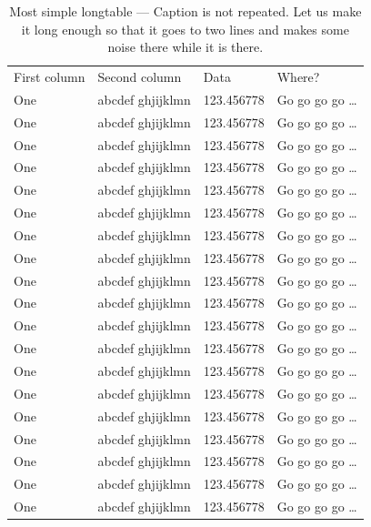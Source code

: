 \documentclass[phd,showframe]{ndsu-thesis-2022}
\begin{document}
\begingroup
\setlength{\LTleft}{1mm plus -1fill}%
\setlength{\LTright}{\LTleft}%
\renewcommand{\arraystretch}{0.5}%
\begin{longtable}{l l l l}
\captionsetup{width=\textwidth}
\caption{Most simple longtable --- Caption is not repeated. Let us make it long enough so that it goes to two lines and makes some noise there while it is there.}\\[-20pt]%
\toprule
First column & Second column & Data & Where?\\
\midrule
One & abcdef ghjijklmn & 123.456778  & Go go go go \ldots \\
One & abcdef ghjijklmn & 123.456778  & Go go go go \ldots \\
One & abcdef ghjijklmn & 123.456778  & Go go go go \ldots \\
One & abcdef ghjijklmn & 123.456778  & Go go go go \ldots \\
One & abcdef ghjijklmn & 123.456778  & Go go go go \ldots \\
One & abcdef ghjijklmn & 123.456778  & Go go go go \ldots \\
One & abcdef ghjijklmn & 123.456778  & Go go go go \ldots \\
One & abcdef ghjijklmn & 123.456778  & Go go go go \ldots \\
One & abcdef ghjijklmn & 123.456778  & Go go go go \ldots \\
One & abcdef ghjijklmn & 123.456778  & Go go go go \ldots \\
One & abcdef ghjijklmn & 123.456778  & Go go go go \ldots \\
One & abcdef ghjijklmn & 123.456778  & Go go go go \ldots \\
One & abcdef ghjijklmn & 123.456778  & Go go go go \ldots \\
One & abcdef ghjijklmn & 123.456778  & Go go go go \ldots \\
One & abcdef ghjijklmn & 123.456778  & Go go go go \ldots \\
One & abcdef ghjijklmn & 123.456778  & Go go go go \ldots \\
One & abcdef ghjijklmn & 123.456778  & Go go go go \ldots \\
One & abcdef ghjijklmn & 123.456778  & Go go go go \ldots \\
One & abcdef ghjijklmn & 123.456778  & Go go go go \ldots \\

\end{longtable}
\end{document}
